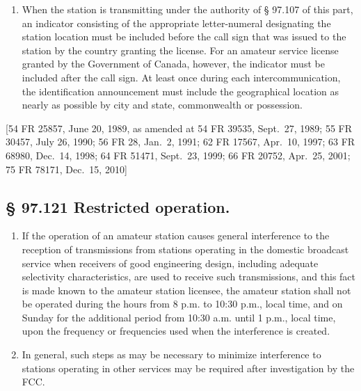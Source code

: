 \documentclass[
  letterpaper,
  DIV=11,
  numbers=noendperiod]{scrreport}
\providecommand{\tightlist}{%
  \setlength{\itemsep}{0pt}\setlength{\parskip}{0pt}}\usepackage{longtable,booktabs,array}
\begin{document}
\begin{enumerate}
\def\labelenumi{(\alph{enumi})}
\setcounter{enumi}{6}
\tightlist
\item
  When the station is transmitting under the authority of § 97.107 of
  this part, an indicator consisting of the appropriate letter-numeral
  designating the station location must be included before the call sign
  that was issued to the station by the country granting the license.
  For an amateur service license granted by the Government of Canada,
  however, the indicator must be included after the call sign. At least
  once during each intercommunication, the identification announcement
  must include the geographical location as nearly as possible by city
  and state, commonwealth or possession.
\end{enumerate}

{[}54 FR 25857, June 20, 1989, as amended at 54 FR 39535, Sept.~27,
1989; 55 FR 30457, July 26, 1990; 56 FR 28, Jan.~2, 1991; 62 FR 17567,
Apr.~10, 1997; 63 FR 68980, Dec.~14, 1998; 64 FR 51471, Sept.~23, 1999;
66 FR 20752, Apr.~25, 2001; 75 FR 78171, Dec.~15, 2010{]}

\hypertarget{restricted-operation.}{%
\subsection*{§ 97.121 Restricted
operation.}\label{restricted-operation.}}

\begin{enumerate}
\def\labelenumi{(\alph{enumi})}
\item
  If the operation of an amateur station causes general interference to
  the reception of transmissions from stations operating in the domestic
  broadcast service when receivers of good engineering design, including
  adequate selectivity characteristics, are used to receive such
  transmissions, and this fact is made known to the amateur station
  licensee, the amateur station shall not be operated during the hours
  from 8 p.m. to 10:30 p.m., local time, and on Sunday for the
  additional period from 10:30 a.m. until 1 p.m., local time, upon the
  frequency or frequencies used when the interference is created.
\item
  In general, such steps as may be necessary to minimize interference to
  stations operating in other services may be required after
  investigation by the FCC.
\end{enumerate}
\end{document}
